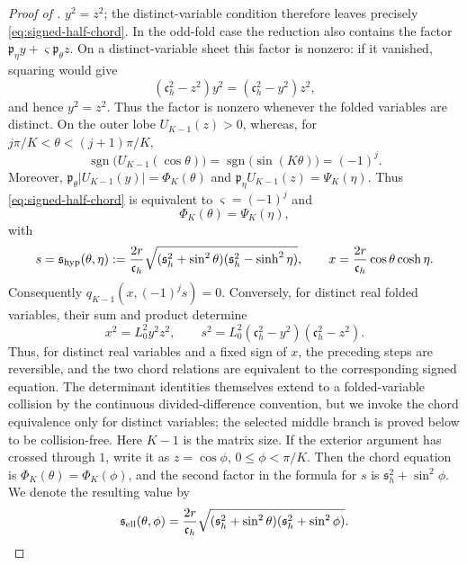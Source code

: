 \documentclass[12pt,anonymous]{iopjournal}
\numberwithin{equation}{section}
\theoremstyle{remark}
\begin{document}
\begin{proof}[Proof of ]
\(y^2=z^2\); the distinct-variable condition therefore leaves precisely
\eqref{eq:signed-half-chord}.  In the odd-fold case the reduction also
contains the factor
\(\mathfrak p_\eta y+\varsigma\mathfrak p_\theta z\).  On a
distinct-variable sheet this factor is nonzero: if it vanished, squaring
would give
\[
 (\mathfrak c_h^2-z^2)y^2=(\mathfrak c_h^2-y^2)z^2,
\]
and hence \(y^2=z^2\).  Thus the factor is nonzero whenever the folded
variables are distinct.  On the outer lobe
\(U_{K-1}(z)>0\), whereas, for
\(j\pi/K<\theta<(j+1)\pi/K\),
\[
 \operatorname{sgn}\bigl(U_{K-1}(\cos\theta)\bigr)
 =\operatorname{sgn}\bigl(\sin(K\theta)\bigr)=(-1)^j.
\]
Moreover,
\(\mathfrak p_\theta|U_{K-1}(y)|=\Phi_K(\theta)\) and
\(\mathfrak p_\eta U_{K-1}(z)=\Psi_K(\eta)\).  Thus
\eqref{eq:signed-half-chord} is equivalent to
\(\varsigma=(-1)^j\) and
\begin{equation}\label{eq:chord-equation}
 \Phi_K(\theta)=\Psi_K(\eta),
\end{equation}
with
\begin{equation}\label{eq:channel-xs}
 s=\mathfrak s_{\rm hyp}(\theta,\eta)
 :=\frac{2r}{\mathfrak c_h}
 \sqrt{(\mathfrak s_h^2+\sin^2\theta)
       (\mathfrak s_h^2-\sinh^2\eta)},\qquad
 x=\frac{2r}{\mathfrak c_h}\cos\theta\cosh\eta.
\end{equation}
Consequently \(q_{K-1}(x,(-1)^js)=0\).  Conversely, for distinct real
folded variables, their sum and product determine
\[
 x^2=L_0^2y^2z^2,\qquad
 s^2=L_0^2(\mathfrak c_h^2-y^2)(\mathfrak c_h^2-z^2).
\]
Thus, for distinct real variables and a fixed sign of \(x\), the
preceding steps are reversible, and the two chord relations are
equivalent to the corresponding signed equation.  The determinant
identities themselves extend to a folded-variable collision by the
continuous divided-difference convention, but we invoke the chord
equivalence only for distinct variables; the selected middle branch is
proved below to be collision-free.
Here \(K-1\) is the matrix size.  If the exterior argument has crossed
through \(1\), write it as \(z=\cos\phi\),
\(0\leq\phi<\pi/K\).  Then the chord equation is
\(\Phi_K(\theta)=\Phi_K(\phi)\), and the second factor in the formula
for \(s\) is \(\mathfrak s_h^2+\sin^2\phi\).  We denote the resulting
value by
\[
 \mathfrak s_{\rm ell}(\theta,\phi)
 =\frac{2r}{\mathfrak c_h}
 \sqrt{(\mathfrak s_h^2+\sin^2\theta)
       (\mathfrak s_h^2+\sin^2\phi)}.
\]


\end{proof}
\end{document}
